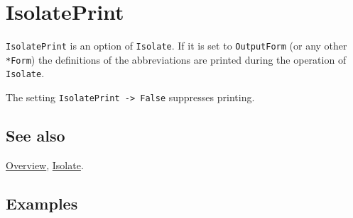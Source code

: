 \documentclass[../FeynCalcManual.tex]{subfiles}
\begin{document}
\hypertarget{isolateprint}{
\section{IsolatePrint}\label{isolateprint}}

\texttt{IsolatePrint} is an option of \texttt{Isolate}. If it is set to
\texttt{OutputForm} (or any other \texttt{*Form}) the definitions of the
abbreviations are printed during the operation of \texttt{Isolate}.

The setting \texttt{IsolatePrint -> False} suppresses printing.

\subsection{See also}

\hyperlink{toc}{Overview}, \hyperlink{isolate}{Isolate}.

\subsection{Examples}
\end{document}
